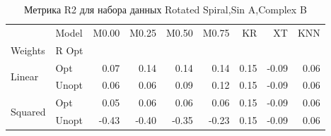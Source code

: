 \begin{table}
\caption{Метрика R2 для набора данных Rotated Spiral,Sin A,Complex B}
\label{tab:R2_Rotated Spiral,Sin A,Complex B}
\begin{tabular}{llrrrrrrr}
\toprule
 & Model & M0.00 & M0.25 & M0.50 & M0.75 & KR & XT & KNN \\
Weights & R Opt &  &  &  &  &  &  &  \\
\midrule
\multirow[t]{2}{*}{Linear} & Opt & 0.07 & 0.14 & 0.14 & 0.14 & 0.15 & -0.09 & 0.06 \\
 & Unopt & 0.06 & 0.06 & 0.09 & 0.12 & 0.15 & -0.09 & 0.06 \\

\multirow[t]{2}{*}{Squared} & Opt & 0.05 & 0.06 & 0.06 & 0.06 & 0.15 & -0.09 & 0.06 \\
 & Unopt & -0.43 & -0.40 & -0.35 & -0.23 & 0.15 & -0.09 & 0.06 \\

\bottomrule
\end{tabular}
\end{table}
